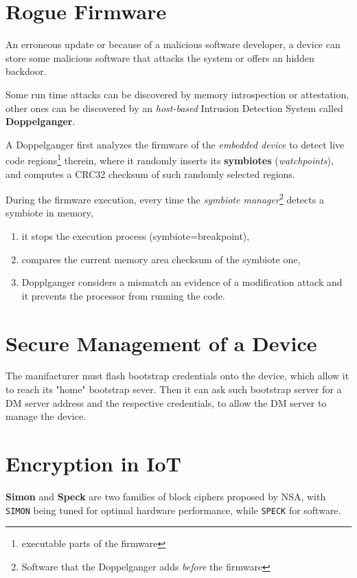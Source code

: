 \newpage
\section{Rogue Firmware}
An erroneous update or because of a malicious software developer, a device can store some malicious software that attacks the
system or offers an hidden backdoor.

Some run time attacks can be discovered by memory introspection or
attestation, other ones can be discovered by an \textit{host-based} Intrusion Detection System called \textbf{Doppelganger}.

A Doppelganger first analyzes the firmware of the \textit{embedded device} to detect
live code regions\footnote{executable parts of the firmware} therein, where it randomly
inserts its \textbf{symbiotes} (\textit{watchpoints}), and computes a CRC32 checksum of such randomly selected regions.

During the firmware execution, every time the \textit{symbiote manager}\footnote{Software that the Doppelganger adds \textit{before} the firmware} detects
a symbiote in memory,
\begin{enumerate}
   \item it stops the execution process (symbiote=breakpoint),
   \item compares the current memory area checksum of the symbiote one,
   \item Dopplganger considers a mismatch an evidence of a modification
   attack and it prevents the processor from running the code.
\end{enumerate}


\section{Secure Management of a Device}
The manifacturer must flash bootstrap credentials onto the device,
which allow it to reach its "home" bootstrap sever.
Then it can ask such bootstrap server for a DM server address and the respective credentials,
to allow the DM server to manage the device.

\section{Encryption in IoT}
\textbf{Simon} and \textbf{Speck} are two families of block ciphers proposed by NSA,
with \texttt{SIMON} being tuned for optimal hardware performance, while \texttt{SPECK} for software.

